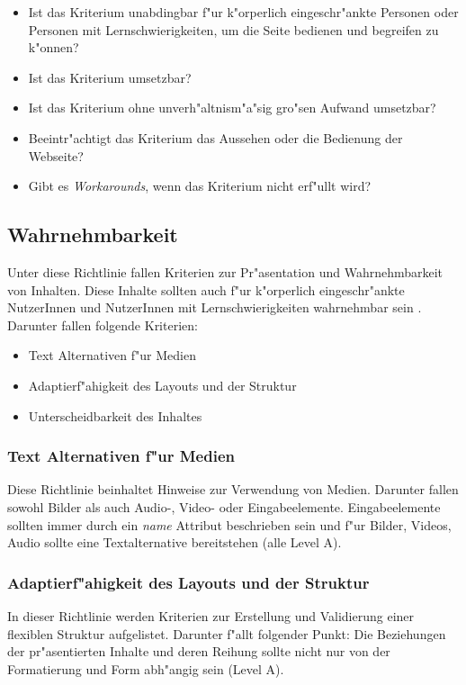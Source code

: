 \documentclass[a4paper,bibtotoc,oneside]{scrbook}
\begin{document}
\begin{itemize}
\item Ist das Kriterium unabdingbar f"ur k"orperlich eingeschr"ankte Personen oder Personen mit Lernschwierigkeiten, um die Seite bedienen und begreifen zu k"onnen?
\item Ist das Kriterium umsetzbar?
\item Ist das Kriterium ohne unverh"altnism"a"sig gro"sen Aufwand umsetzbar?
\item Beeintr"achtigt das Kriterium das Aussehen oder die Bedienung der Webseite?
\item Gibt es \emph{Workarounds}, wenn das Kriterium nicht erf"ullt wird?
\end{itemize}


\subsection{Wahrnehmbarkeit}
Unter diese Richtlinie fallen Kriterien zur Pr"asentation und Wahrnehmbarkeit von Inhalten. Diese Inhalte sollten auch f"ur k"orperlich eingeschr"ankte NutzerInnen und NutzerInnen mit Lernschwierigkeiten wahrnehmbar sein \cite[Abschnitt 1]{wcag2} . Darunter fallen folgende Kriterien: 

\begin{itemize}
\item Text Alternativen f"ur Medien \cite[Abschnitt 1.1 und 1.2]{wcag2}
\item Adaptierf"ahigkeit des Layouts und der Struktur \cite[Abschnitt 1.3]{wcag2}
\item Unterscheidbarkeit des Inhaltes \cite[Abschnitt 1.4]{wcag2}
\end{itemize}

\subsubsection{Text Alternativen f"ur Medien}
Diese Richtlinie beinhaltet Hinweise zur Verwendung von Medien. Darunter fallen sowohl Bilder als auch Audio-, Video- oder Eingabeelemente. Eingabeelemente sollten immer durch ein \emph{name} Attribut beschrieben sein und f"ur Bilder, Videos, Audio sollte eine Textalternative bereitstehen (alle Level A). \cite[Abschnitt 1.1 und 1.2]{wcag2}

\subsubsection{Adaptierf"ahigkeit des Layouts und der Struktur}
In dieser Richtlinie werden Kriterien zur Erstellung und Validierung einer flexiblen Struktur aufgelistet. Darunter f"allt folgender Punkt: Die Beziehungen der pr"asentierten Inhalte und deren Reihung sollte nicht nur von der Formatierung und Form abh"angig sein (Level A).\cite[Abschnitt 1.3]{wcag2}
\end{document}
